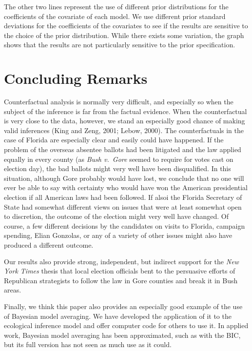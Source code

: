 \documentclass[11pt,titlepage]{article}
\begin{document}
The other two lines represent the use of different prior distributions
for the coefficients of the covariate of each model.  We use different
prior standard deviations for the coefficients of the covariates to
see if the results are sensitive to the choice of the prior
distribution.  While there exists some variation, the graph shows that
the results are not particularly sensitive to the prior specification.

\section{Concluding Remarks}\label{s:concl}

Counterfactual analysis is normally very difficult, and especially so
when the subject of the inference is far from the factual evidence.
When the counterfactual is very close to the data, however, we stand
an especially good chance of making valid inferences (King and Zeng,
2001; Lebow, 2000)\nocite{KinZen01,Lebow00}.  The counterfactuals in
the case of Florida are especially clear and easily could have
happened.  If the problem of the overseas absentee ballots had been
litigated and the law applied equally in every county (as \emph{Bush
  v.\ Gore} seemed to require for votes cast on election day), the bad
ballots might very well have been disqualified.  In this situation,
although Gore probably would have lost, we conclude that no one will
ever be able to say with certainty who would have won the American
presidential election if all American laws had been followed.  If
alsoi the Florida Secretary of State had somewhat different views on
issues that were at least somewhat open to discretion, the outcome of
the election might very well have changed.  Of course, a few different
decisions by the candidates on visits to Florida, campaign spending,
Elian Gonzolas, or any of a variety of other issues might also have
produced a different outcome.

Our results also provide strong, independent, but indirect support for
the \emph{New York Times} thesis that local election officials bent to
the persuasive efforts of Republican strategists to follow the law in
Gore counties and break it in Bush areas.

Finally, we think this paper also provides an especially good example
of the use of Bayesian model averaging.  We have developed the
application of it to the ecological inference model and offer computer
code for others to use it.  In applied work, Bayesian model averaging
has been approximated, such as with the BIC, but its full version has
not seen as much use as it could.
\end{document}
